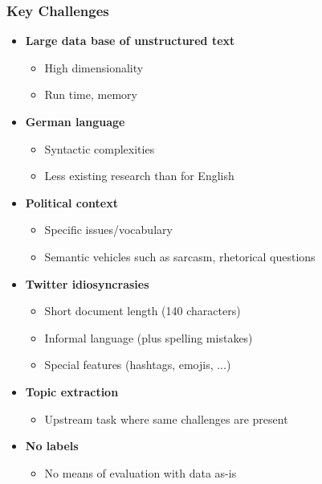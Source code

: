 \documentclass[t]{beamer}
\newcommand{\arrowitem}{\item[\textcolor{gray!90}{$\rightarrow$}]}
\begin{document}
\begin{frame}
\frametitle{Key Challenges}

\begin{itemize}
  \footnotesize
  \item \textbf{Large data base of unstructured text}
  \begin{itemize}
    \footnotesize
    \arrowitem High dimensionality
    \arrowitem Run time, memory
  \end{itemize}
  \item \textbf{German language}
  \begin{itemize}
    \footnotesize
    \arrowitem Syntactic complexities
    \arrowitem Less existing research than for English
  \end{itemize}
  \item \textbf{Political context}
  \begin{itemize}
    \footnotesize
    \arrowitem Specific issues/vocabulary
    \arrowitem Semantic vehicles such as sarcasm, rhetorical questions
  \end{itemize}
  \item \textbf{Twitter idiosyncrasies}
  \begin{itemize}
    \footnotesize
    \arrowitem Short document length (140 characters)
    \arrowitem Informal language (plus spelling mistakes)
    \arrowitem Special features (hashtags, emojis, ...)
  \end{itemize}
  \item \textbf{Topic extraction}
  \begin{itemize}
    \footnotesize
    \arrowitem Upstream task where same challenges are present
  \end{itemize}
  \item \textbf{No labels}
  \begin{itemize}
    \footnotesize  
    \arrowitem No means of evaluation with data as-is
  \end{itemize}
\end{itemize}

\end{frame}

\end{document}
